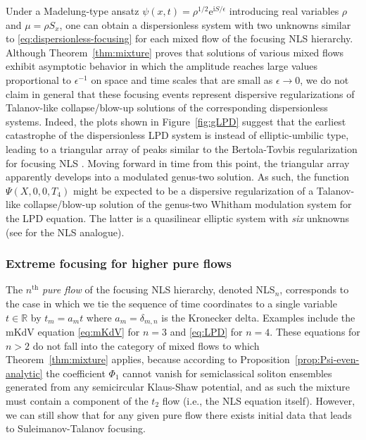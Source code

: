 \documentclass[12pt]{amsart}
\numberwithin{equation}{section}
\newcommand{\ee}{\mathrm{e}}
\newcommand{\ii}{\mathrm{i}}
\newcommand{\phaseint}{\Phi}
\newcommand{\eps}{\epsilon}
\begin{document}
\begin{rem}
Under a Madelung-type ansatz $\psi(x,t)=\rho^{1/2}\ee^{\ii S/\eps}$ introducing real variables $\rho$ and $\mu=\rho S_x$, one can obtain a dispersionless system with two unknowns similar to \eqref{eq:dispersionless-focusing} for each mixed flow of the focusing NLS hierarchy.
Although Theorem~\ref{thm:mixture} proves that solutions of various mixed flows exhibit asymptotic behavior in which the amplitude reaches large values proportional to $\eps^{-1}$ on space and time scales that are small as $\eps\to 0$, we do not claim in general that these focusing events represent dispersive regularizations of Talanov-like collapse/blow-up solutions of the corresponding dispersionless systems.  Indeed, the plots shown in Figure~\ref{fig:gLPD} suggest that the earliest catastrophe of the dispersionless LPD system is instead of elliptic-umbilic type, leading to a triangular array of peaks similar to the Bertola-Tovbis regularization for focusing NLS \cite{BertolaT13}.  Moving forward in time from this point, the triangular array apparently develops into a modulated genus-two solution.  As such, the function $\Psi(X,0,0,T_4)$ might be expected to be a dispersive regularization of a Talanov-like collapse/blow-up solution of the genus-two Whitham modulation system for the LPD equation.  The latter is a quasilinear elliptic system with \emph{six} unknowns (see \cite{ForestL86} for the NLS analogue).
\label{rem:higher-genus}
\end{rem}

\subsubsection{Extreme focusing for higher pure flows}
The $n^\mathrm{th}$  \emph{pure flow} of the focusing NLS hierarchy, denoted NLS$_n$, corresponds to the case in which we tie the sequence of time coordinates to a single variable $t\in\mathbb{R}$ by $t_m=a_mt$ where $a_m=\delta_{m,n}$ is the Kronecker delta.  Examples include the mKdV equation \eqref{eq:mKdV} for $n=3$ and \eqref{eq:LPD} for $n=4$.  These equations for $n>2$ do not fall into the category of mixed flows to which Theorem~\ref{thm:mixture} applies, because according to Proposition~\ref{prop:Psi-even-analytic} the coefficient $\phaseint_1$ cannot vanish for semiclassical soliton ensembles generated from any semicircular Klaus-Shaw potential, and as such the mixture must contain a component of the $t_2$ flow (i.e., the NLS equation itself).  However, we can still show that for any given pure flow there exists initial data that leads to Suleimanov-Talanov focusing.
\end{document}
